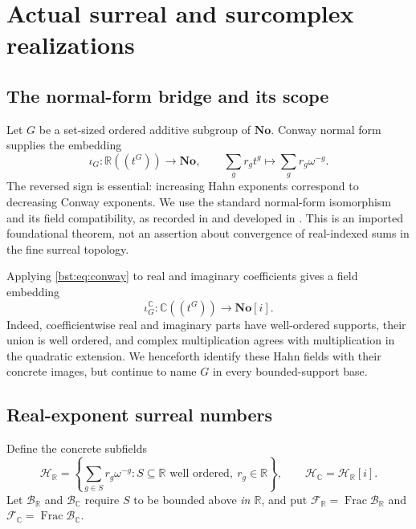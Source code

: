 \documentclass[11pt,letterpaper]{article}
\theoremstyle{definition}
\theoremstyle{remark}
\newcommand{\R}{\mathbb R}
\newcommand{\C}{\mathbb C}
\newcommand{\No}{\mathbf{No}}
\newcommand{\Frac}{\operatorname{Frac}}
\newcommand{\HH}[2]{#1((t^{#2}))}
\begin{document}
\section{Actual surreal and surcomplex realizations}\label{bst:sec:surreal}

\subsection{The normal-form bridge and its scope}

Let $G$ be a set-sized ordered additive subgroup of $\No$. Conway normal
form supplies the embedding
\begin{equation}\label{bst:eq:conway}
 \iota_G:\HH{\R}G\longrightarrow\No,
 \qquad \sum_g r_gt^g\longmapsto\sum_g r_g\omega^{-g}.
\end{equation}
The reversed sign is essential: increasing Hahn exponents correspond to
decreasing Conway exponents. We use the standard normal-form isomorphism
and its field compatibility, as recorded in \cite[Section~2.3]{LM24} and
developed in \cite{Gonshor}. This is an imported foundational theorem,
not an assertion about convergence of real-indexed sums in the fine
surreal topology.

Applying \eqref{bst:eq:conway} to real and imaginary coefficients gives a field
embedding
\[
 \iota_G^{\C}:\HH{\C}G\longrightarrow\No[i].
\]
Indeed, coefficientwise real and imaginary parts have well-ordered
supports, their union is well ordered, and complex multiplication agrees
with multiplication in the quadratic extension. We henceforth identify
these Hahn fields with their concrete images, but continue to name $G$ in
every bounded-support base.

\subsection{Real-exponent surreal numbers}

Define the concrete subfields
\[
 \mathscr H_\R=\left\{\sum_{g\in S}r_g\omega^{-g}:
       S\subseteq\R\text{ well ordered},\ r_g\in\R\right\},
 \qquad \mathscr H_\C=\mathscr H_\R[i].
\]
Let $\mathscr B_\R$ and $\mathscr B_\C$ require $S$ to be bounded above
\emph{in $\R$}, and put $\mathscr F_\R=\Frac\mathscr B_\R$ and
$\mathscr F_\C=\Frac\mathscr B_\C$.
\end{document}
